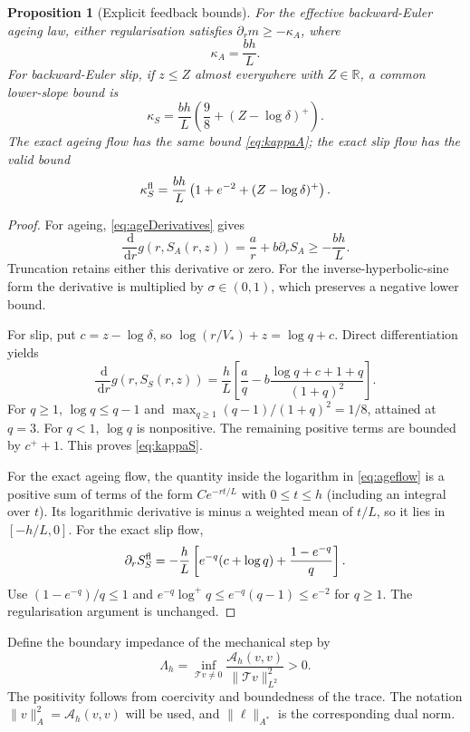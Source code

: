 \documentclass[11pt,a4paper]{article}
\newtheorem{proposition}[theorem]{Proposition}
\theoremstyle{definition}\newtheorem{definition}[theorem]{Definition}
\theoremstyle{remark}\newtheorem{remark}[theorem]{Remark}
\newcommand{\R}{\mathbb R}
\newcommand{\dd}{\,\mathrm d}
\newcommand{\norm}[1]{\lVert #1\rVert}
\newcommand{\A}{\mathcal A}
\newcommand{\tr}{\mathcal T}
\numberwithin{equation}{section}
\begin{document}
\begin{proposition}[Explicit feedback bounds]\label{prop:kappa}
For the effective backward-Euler ageing law, either regularisation satisfies $\partial_rm\ge-\kappa_A$, where
\begin{equation}\label{eq:kappaA}
 \kappa_A=\frac{bh}{L}.
\end{equation}
For backward-Euler slip, if $z\le Z$ almost everywhere with $Z\in\R$, a common lower-slope bound is
\begin{equation}\label{eq:kappaS}
 \kappa_S=\frac{bh}{L}\left(\frac98+(Z-\log\delta)^+\right).
\end{equation}
The exact ageing flow has the same bound \eqref{eq:kappaA}; the exact slip flow has the valid bound
\begin{equation}\label{eq:kappaSflow}
 \kappa_S^{\rm fl}=\frac{bh}{L}
        \left(1+e^{-2}+(Z-\log\delta)^+\right).
\end{equation}
\end{proposition}
\begin{proof}
For ageing, \eqref{eq:ageDerivatives} gives
\[
 \frac{\dd}{\dd r}g(r,S_A(r,z))
 =\frac ar+b\partial_rS_A\ge-\frac{bh}{L}.
\]
Truncation retains either this derivative or zero. For the inverse-hyperbolic-sine form the derivative is multiplied by $\sigma\in(0,1)$, which preserves a negative lower bound.

For slip, put $c=z-\log\delta$, so $\log(r/V_*)+z=\log q+c$. Direct differentiation yields
\begin{equation}\label{eq:slipgprime}
 \frac{\dd}{\dd r}g(r,S_S(r,z))
 =\frac hL\left[\frac aq-
 b\frac{\log q+c+1+q}{(1+q)^2}\right].
\end{equation}
For $q\ge1$, $\log q\le q-1$ and
$\max_{q\ge1}(q-1)/(1+q)^2=1/8$, attained at $q=3$. For $q<1$, $\log q$ is nonpositive. The remaining positive terms are bounded by $c^++1$. This proves \eqref{eq:kappaS}.

For the exact ageing flow, the quantity inside the logarithm in \eqref{eq:ageflow} is a positive sum of terms of the form $Ce^{-rt/L}$ with $0\le t\le h$ (including an integral over $t$). Its logarithmic derivative is minus a weighted mean of $t/L$, so it lies in $[-h/L,0]$.
For the exact slip flow,
\[
 \partial_rS_S^{\rm fl}=-\frac hL
 \left[e^{-q}(c+\log q)+\frac{1-e^{-q}}q\right].
\]
Use $(1-e^{-q})/q\le1$ and
$e^{-q}\log^+q\le e^{-q}(q-1)\le e^{-2}$ for $q\ge1$. The regularisation argument is unchanged.
\end{proof}

Define the boundary impedance of the mechanical step by
\begin{equation}\label{eq:impedance}
 \Lambda_h=\inf_{\tr v\ne0}\frac{\A_h(v,v)}{\norm{\tr v}_{L^2}^2}>0.
\end{equation}
The positivity follows from coercivity and boundedness of the trace. The notation $\norm v_A^2=\A_h(v,v)$ will be used, and $\norm\ell_{A^*}$ is the corresponding dual norm.
\end{document}
